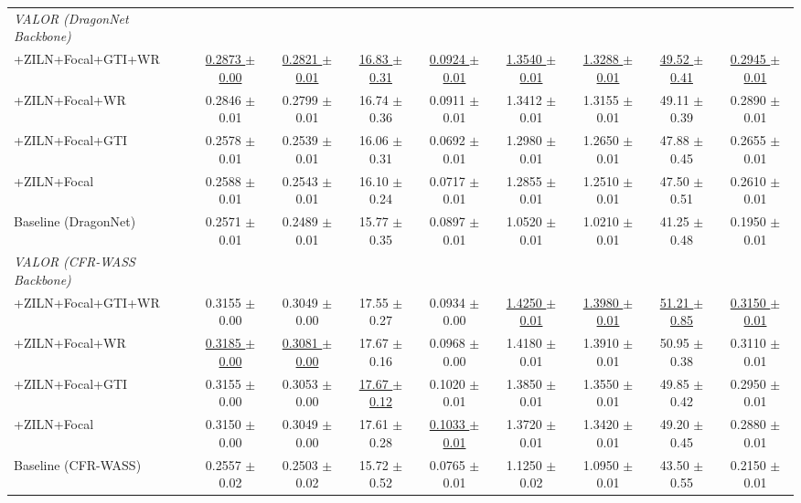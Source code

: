 \documentclass[runningheads]{llncs}
\begin{document}
\begin{table}[t]
{\begin{tabular}{lcccc|cccc}
    \textit{VALOR (DragonNet Backbone)} & & & & & & & & \\
    \hspace{3mm}+ZILN+Focal+GTI+WR & \underline{0.2873 $\pm$ 0.00} & \underline{0.2821 $\pm$ 0.01} & \underline{16.83 $\pm$ 0.31} & \underline{0.0924 $\pm$ 0.01} & \underline{1.3540 $\pm$ 0.01} & \underline{1.3288 $\pm$ 0.01} & \underline{49.52 $\pm$ 0.41} & \underline{0.2945 $\pm$ 0.01} \\
    \hspace{3mm}+ZILN+Focal+WR & 0.2846 $\pm$ 0.01 & 0.2799 $\pm$ 0.01 & 16.74 $\pm$ 0.36 & 0.0911 $\pm$ 0.01 & 1.3412 $\pm$ 0.01 & 1.3155 $\pm$ 0.01 & 49.11 $\pm$ 0.39 & 0.2890 $\pm$ 0.01 \\
    \hspace{3mm}+ZILN+Focal+GTI & 0.2578 $\pm$ 0.01 & 0.2539 $\pm$ 0.01 & 16.06 $\pm$ 0.31 & 0.0692 $\pm$ 0.01 & 1.2980 $\pm$ 0.01 & 1.2650 $\pm$ 0.01 & 47.88 $\pm$ 0.45 & 0.2655 $\pm$ 0.01 \\
    \hspace{3mm}+ZILN+Focal & 0.2588 $\pm$ 0.01 & 0.2543 $\pm$ 0.01 & 16.10 $\pm$ 0.24 & 0.0717 $\pm$ 0.01 & 1.2855 $\pm$ 0.01 & 1.2510 $\pm$ 0.01 & 47.50 $\pm$ 0.51 & 0.2610 $\pm$ 0.01 \\
    \hspace{3mm}Baseline (DragonNet) & 0.2571 $\pm$ 0.01 & 0.2489 $\pm$ 0.01 & 15.77 $\pm$ 0.35 & 0.0897 $\pm$ 0.01 & 1.0520 $\pm$ 0.01 & 1.0210 $\pm$ 0.01 & 41.25 $\pm$ 0.48 & 0.1950 $\pm$ 0.01 \\
    \midrule

    \textit{VALOR (CFR-WASS Backbone)} & & & & & & & & \\
    \hspace{3mm}+ZILN+Focal+GTI+WR & 0.3155 $\pm$ 0.00 & 0.3049 $\pm$ 0.00 & 17.55 $\pm$ 0.27 & 0.0934 $\pm$ 0.00 & \underline{1.4250 $\pm$ 0.01} & \underline{1.3980 $\pm$ 0.01} & \underline{51.21 $\pm$ 0.85} & \underline{0.3150 $\pm$ 0.01} \\
    \hspace{3mm}+ZILN+Focal+WR & \underline{0.3185 $\pm$ 0.00} & \underline{0.3081 $\pm$ 0.00} & 17.67 $\pm$ 0.16 & 0.0968 $\pm$ 0.00 & 1.4180 $\pm$ 0.01 & 1.3910 $\pm$ 0.01 & 50.95 $\pm$ 0.38 & 0.3110 $\pm$ 0.01 \\
    \hspace{3mm}+ZILN+Focal+GTI & 0.3155 $\pm$ 0.00 & 0.3053 $\pm$ 0.00 & \underline{17.67 $\pm$ 0.12} & 0.1020 $\pm$ 0.01 & 1.3850 $\pm$ 0.01 & 1.3550 $\pm$ 0.01 & 49.85 $\pm$ 0.42 & 0.2950 $\pm$ 0.01 \\
    \hspace{3mm}+ZILN+Focal & 0.3150 $\pm$ 0.00 & 0.3049 $\pm$ 0.00 & 17.61 $\pm$ 0.28 & \underline{0.1033 $\pm$ 0.01} & 1.3720 $\pm$ 0.01 & 1.3420 $\pm$ 0.01 & 49.20 $\pm$ 0.45 & 0.2880 $\pm$ 0.01 \\
    \hspace{3mm}Baseline (CFR-WASS) & 0.2557 $\pm$ 0.02 & 0.2503 $\pm$ 0.02 & 15.72 $\pm$ 0.52 & 0.0765 $\pm$ 0.01 & 1.1250 $\pm$ 0.02 & 1.0950 $\pm$ 0.01 & 43.50 $\pm$ 0.55 & 0.2150 $\pm$ 0.01 \\
    \midrule


\end{tabular}}
\end{table}
\end{document}

